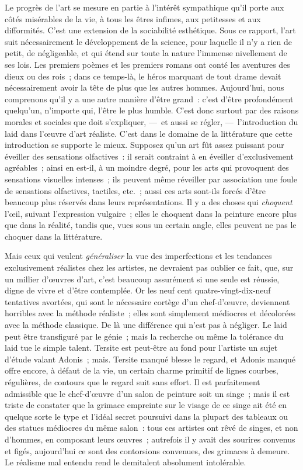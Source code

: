 \documentclass[french,twoside]{book} %
\begin{document}
Le progrès de l’art se mesure en partie à l’intérêt sympathique qu’il porte aux côtés misérables de la vie, à tous les êtres infimes, aux petitesses et aux difformités. C’est une extension de la sociabilité esthétique. Sous ce rapport, l’art suit nécessairement le développement de la science, pour laquelle il n’y a rien de petit, de négligeable, et qui étend sur toute la nature l’immense nivellement de ses lois. Les premiers poèmes et les premiers romans ont conté les aventures des dieux ou des rois ; dans ce temps-là, le héros marquant de tout drame devait nécessairement avoir la tête de plus que les autres hommes. Aujourd’hui, nous comprenons qu’il y a une autre manière d’être grand : c’est d’être profondément quelqu’un, n’importe qui, l’être le plus humble. C’est donc surtout par des raisons morales et sociales que doit s’expliquer, — et aussi se régler, — l’introduction du laid dans l’œuvre d’art réaliste. C’est dans le domaine de la littérature que cette introduction se supporte le mieux. Supposez qu’un art fût assez puissant pour éveiller des sensations olfactives : il serait contraint à en éveiller d’exclusivement agréables ; ainsi en est-il, à un moindre degré, pour les arts qui provoquent des sensations visuelles intenses ; ils peuvent même réveiller par association une foule de sensations olfactives, tactiles, etc. ; aussi ces arts sont-ils forcés d’être beaucoup plus réservés dans leurs représentations. Il y a des choses qui \emph{choquent} l’œil, suivant l’expression vulgaire ; elles le choquent dans la peinture encore plus que dans la réalité, tandis que, vues sous un certain angle, elles peuvent ne pas le choquer dans la littérature.\par
Mais ceux qui veulent \emph{généraliser} la vue des imperfections et les tendances exclusivement réalistes chez les artistes, ne devraient pas oublier ce fait, que, sur un millier d’œuvres d’art, c’est beaucoup assurément si une seule est réussie, digne de vivre et d’être contemplée. Or les neuf cent quatre-vingt-dix-neuf tentatives avortées, qui sont le nécessaire cortège d’un chef-d’œuvre, deviennent horribles avec la méthode réaliste ; elles sont simplement médiocres et décolorées avec la méthode classique. De là une différence qui n’est pas à négliger. Le laid peut être transfiguré par le génie ; mais la recherche ou même la tolérance du laid tue le simple talent. Tersite est peut-être au fond pour l’artiste un sujet d’étude valant Adonis ; mais. Tersite manqué blesse le regard, et Adonis manqué offre encore, à défaut de la vie, un certain charme primitif de lignes courbes, régulières, de contours que le regard suit sans effort. Il est parfaitement admissible que le chef-d’œuvre d’un salon de peinture soit un singe ; mais il est triste de constater que la grimace empreinte sur le visage de ce singe ait été en quelque sorte le type et l’idéal secret poursuivi dans la plupart des tableaux ou des statues médiocres du même salon : tous ces artistes ont rêvé de singes, et non d’hommes, en composant leurs œuvres ; autrefois il y avait des sourires convenus et figés, aujourd’hui ce sont des contorsions convenues, des grimaces à demeure. Le réalisme mal entendu rend le demitalent absolument intolérable.\par
\end{document}
